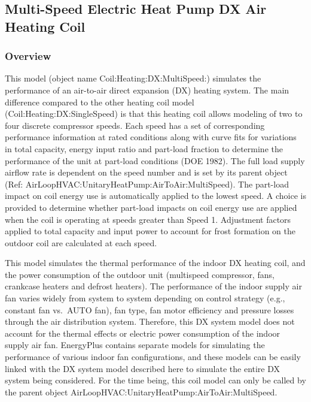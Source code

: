 \subsection{Multi-Speed Electric Heat Pump DX Air Heating Coil}\label{multi-speed-electric-heat-pump-dx-air-heating-coil}

\subsubsection{Overview}\label{overview-7-000}

This model (object name Coil:Heating:DX:MultiSpeed:) simulates the performance of an air-to-air direct expansion (DX) heating system. The main difference compared to the other heating coil model (Coil:Heating:DX:SingleSpeed) is that this heating coil allows modeling of two to four discrete compressor speeds. Each speed has a set of corresponding performance information at rated conditions along with curve fits for variations in total capacity, energy input ratio and part-load fraction to determine the performance of the unit at part-load conditions (DOE 1982). The full load supply airflow rate is dependent on the speed number and is set by its parent object (Ref: AirLoopHVAC:UnitaryHeatPump:AirToAir:MultiSpeed). The part-load impact on coil energy use is automatically applied to the lowest speed. A choice is provided to determine whether part-load impacts on coil energy use are applied when the coil is operating at speeds greater than Speed 1. Adjustment factors applied to total capacity and input power to account for frost formation on the outdoor coil are calculated at each speed.

This model simulates the thermal performance of the indoor DX heating coil, and the power consumption of the outdoor unit (multispeed compressor, fans, crankcase heaters and defrost heaters). The performance of the indoor supply air fan varies widely from system to system depending on control strategy (e.g., constant fan vs.~AUTO fan), fan type, fan motor efficiency and pressure losses through the air distribution system. Therefore, this DX system model does not account for the thermal effects or electric power consumption of the indoor supply air fan. EnergyPlus contains separate models for simulating the performance of various indoor fan configurations, and these models can be easily linked with the DX system model described here to simulate the entire DX system being considered. For the time being, this coil model can only be called by the parent object AirLoopHVAC:UnitaryHeatPump:AirToAir:MultiSpeed.

